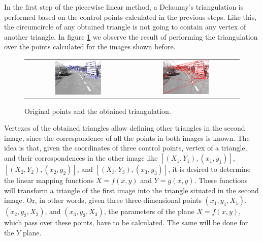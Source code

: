 In the first step of the piecewise linear method, a Delaunay’s triangulation is performed based on the control points calculated in the previous steps. Like this, the circumcircle of any obtained triangle is not going to contain any vertex of another triangle. In figure \ref{fig:cp02_triangulation} we observe the result of performing the triangulation over the points calculated for the images shown before.

\begin{figure}[h!]
\begin{tabular}{cc}
\includegraphics[width=0.45\textwidth]{triangulation1}\label{fig:cp02_triangulation_1} &
\includegraphics[width=0.45\textwidth]{triangulation2}\label{fig:cp02_triangulation_2}
\end{tabular}
\caption{Original points and the obtained triangulation.}\label{fig:cp02_triangulation}
\end{figure}

Vertexes of the obtained triangles allow defining other triangles in the second image, since the correspondence of all the points in both images is known. The idea is that, given the coordinates of three control points, vertex of a triangle, and their correspondences in the other image like $[(X_1, Y_1), (x_1, y_1)]$, $[(X_2, Y_2), (x_2, y_2)]$, and $[(X_3, Y_3), (x_3, y_3)]$, it is desired to determine the linear mapping functions $X = f(x, y)$ and $Y = g(x, y)$. These functions will transform a triangle of the first image into the triangle situated in the second image. Or, in other words, given three three-dimensional points $(x_1, y_1, X_1)$, $(x_2, y_2, X_2)$, and $(x_3, y_3, X_3)$, the parameters of the plane $X = f(x, y)$, which pass over these points, have to be calculated. The same will be done for the $Y$ plane.

